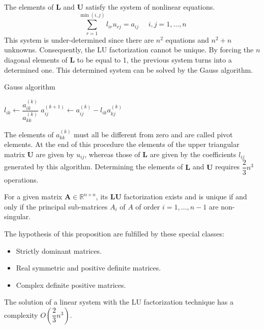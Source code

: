 \documentclass[12pt, a4paper]{report}
\newtheorem[style=M,bodystyle=\normalfont]{theorem}{Theorem}
\newtheorem[style=M,bodystyle=\normalfont]{proposition}{Proposition}
\newtheorem[style=M,bodystyle=\normalfont]{corollary}{Corollary}
\newtheorem[style=M,bodystyle=\normalfont]{lemma}{Lemma}
\newtheorem[style=M,bodystyle=\normalfont]{definition}{Definition}
\begin{document}
    The elements of $\boldsymbol{L}$ and $\boldsymbol{U}$ satisfy the system of nonlinear equations. 
    \[\sum_{r=1}^{\min{(i,j)}}{l_{ir}u_{rj}}=a_{ij} \:\:\:\:\:\: i,j=1,\dots,n\]
    This system is under-determined since there are $n^2$ equations and $n^2+n$ unknowns. Consequently, the LU factorization cannot be 
    unique. By forcing the $n$ diagonal elements of $\boldsymbol{L}$ to be equal to 1, the previous system turns into a determined 
    one. This determined system can be solved by the Gauss algorithm.
    \begin{algorithm}[H]
        \caption{Gauss algorithm}
            \begin{algorithmic}[1]
                        \State $l_{ik} \leftarrow \dfrac{a_{ik}^{(k)}}{a_{kk}^{(k)}}$
                            \State $a_{ij}^{(k+1)} \leftarrow a_{ij}^{(k)}-l_{ik}a_{kj}^{(k)}$
                        \EndFor
                    \EndFor
                \EndFor
            \end{algorithmic}
    \end{algorithm}
    The elements of $a_{kk}^{(k)}$ must all be different from zero and are called pivot elements. 
    At the end of this procedure the elements of the upper triangular matrix $\boldsymbol{U}$ are given by $u_{ij}$, whereas those of 
    $\boldsymbol{L}$ are given by the coefficients $l_{ij}$ generated by this algorithm. Determining the elements of $\boldsymbol{L}$ 
    and $\boldsymbol{U}$ requires $\dfrac{2}{3}n^3$ operations. 
    \begin{proposition}
        For a given matrix $\boldsymbol{A} \in \mathbb{R}^{n \times n}$, its $\boldsymbol{LU}$ factorization exists and is unique 
        if and only if the principal sub-matrices $A_i$ of $A$ of order $i=1,\dots,n-1$ are non-singular. 
    \end{proposition}
    The hypothesis of this proposition are fulfilled by these special classes: 
    \begin{itemize}
        \item Strictly dominant matrices. 
        \item Real symmetric and positive definite matrices. 
        \item Complex definite positive matrices. 
    \end{itemize}
    The solution of a linear system with the LU factorization technique has a complexity $O(\dfrac{2}{3}n^3)$. 
\end{document}
